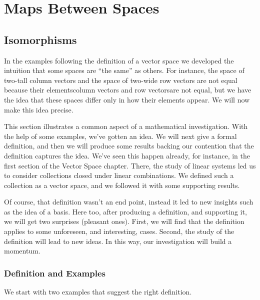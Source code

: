 \chapter{Maps Between Spaces}

\section{Isomorphisms}
In the examples following the definition of a vector space
we developed the intuition that some spaces are ``the same'' as others.
For instance, the space of two-tall column vectors and
the space of two-wide row vectors
are not equal because their 
elements\Dash column vectors and row vectors\Dash are 
not equal, but we have 
the idea that these spaces differ only in how their elements appear.
We will now make this idea precise.

This section illustrates a common aspect of a mathematical investigation.
With the help of some examples, we've gotten an idea.
We will next give a formal definition, and then
we will produce some results backing our contention 
that the definition captures the idea.
We've seen this happen already, 
for instance, in the first section of the Vector Space chapter.
There, the study of linear systems
led us to consider collections closed under linear combinations.
We defined such a collection as a vector space, and
we followed it with some supporting results.

Of course, that definition wasn't an end point, 
instead it led to new insights such as the idea of a basis.
Here too, after producing a definition, and supporting it,
we will get two surprises (pleasant ones).
First, we will find that 
the definition applies to some unforeseen, and interesting, cases.
Second, the study of the definition will lead to new ideas.
In this way, our investigation will build a momentum.










\subsection{Def{}inition and Examples}
We start with two examples
that suggest the right definition. 

